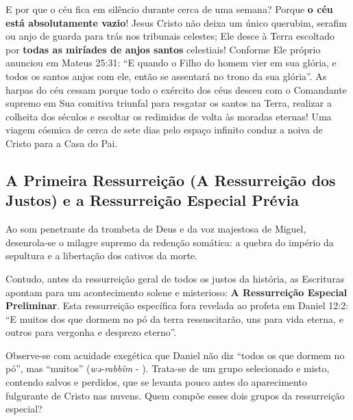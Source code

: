 E por que o céu fica em silêncio durante cerca de uma semana?
Porque \textbf{o céu está absolutamente vazio}!
Jesus Cristo não deixa um único querubim, serafim ou anjo de guarda para trás nos tribunais celestes; Ele desce à Terra escoltado por \textbf{todas as miríades de anjos santos} celestiais! Conforme Ele próprio anunciou em Mateus 25:31: ``E quando o Filho do homem vier em sua glória, e todos os santos anjos com ele, então se assentará no trono da sua glória''.
As harpas do céu cessam porque todo o exército dos céus desceu com o Comandante supremo em Sua comitiva triunfal para resgatar os santos na Terra, realizar a colheita dos séculos e escoltar os redimidos de volta às moradas eternas! Uma viagem cósmica de cerca de sete dias pelo espaço infinito conduz a noiva de Cristo para a Casa do Pai.



\subsection{A Primeira Ressurreição (A Ressurreição dos Justos) e a Ressurreição Especial Prévia}


Ao som penetrante da trombeta de Deus e da voz majestosa de Miguel, desenrola-se o milagre supremo da redenção somática: a quebra do império da sepultura e a libertação dos cativos da morte.

Contudo, antes da ressurreição geral de todos os justos da história, as Escrituras apontam para um acontecimento solene e misterioso: \textbf{A Ressurreição Especial Preliminar}.
Esta ressurreição específica fora revelada ao profeta em Daniel 12:2:
``E muitos dos que dormem no pó da terra ressuscitarão, uns para vida eterna, e outros para vergonha e desprezo eterno''.

Observe-se com acuidade exegética que Daniel não diz ``todos os que dormem no pó'', mas ``muitos'' (\textit{wə-rabbîm} - ). Trata-se de um grupo selecionado e misto, contendo salvos e perdidos, que se levanta pouco antes do aparecimento fulgurante de Cristo nas nuvens. Quem compõe esses dois grupos da ressurreição especial?

